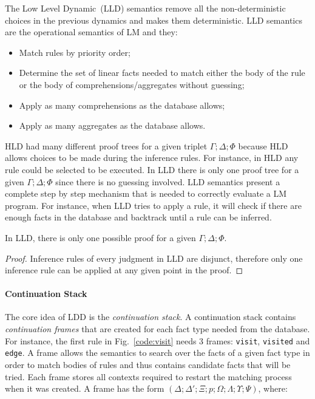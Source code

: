 The Low Level Dynamic~(LLD) semantics remove all the non-deterministic choices
in the previous dynamics and makes them deterministic. LLD semantics are the
operational semantics of LM and they:

\begin{itemize}
   \item Match rules by priority order;

   \item Determine the set of linear facts needed to match either the body of
   the rule or the body of comprehensions/aggregates without guessing;

   \item Apply as many comprehensions as the database allows;

   \item Apply as many aggregates as the database allows.

\end{itemize}

HLD had many different proof trees for a given triplet $\Gamma; \Delta; \Phi$
because HLD allows choices to be made during the inference rules. For instance,
in HLD any rule could be selected to be executed. In LLD there is only
one proof tree for a given $\Gamma; \Delta; \Phi$ since there is no
guessing involved. LLD semantics present a complete step by step
mechanism that is needed to correctly evaluate a LM program. For
instance, when LLD tries to apply a rule, it will check if there are
enough facts in the database and backtrack until a rule can be inferred.

\begin{theorem}
In LLD, there is only one possible proof for a given $\Gamma; \Delta; \Phi$.
\end{theorem}
\begin{proof}
Inference rules of every judgment in LLD are disjunct, therefore only one
inference rule can be applied at any given point in the proof.
\end{proof}

\paragraph{Continuation Stack} The core idea of LDD is the \emph{continuation
stack}. A continuation stack contains \emph{continuation frames} that are
created for each fact type needed from the database. For instance, the first
rule in Fig.~\ref{code:visit} needs 3 frames: \texttt{visit},
\texttt{visited} and \texttt{edge}. A frame allows the semantics to search
over the facts of a given fact type in order to match bodies of rules and
thus contains candidate facts that will be tried.  Each frame stores all
contexts required to restart the matching process when it was created.  A
frame has the form $(\Delta; \Delta'; \Xi; p; \Omega; \Lambda; \Upsilon;
\Psi)$, where:

